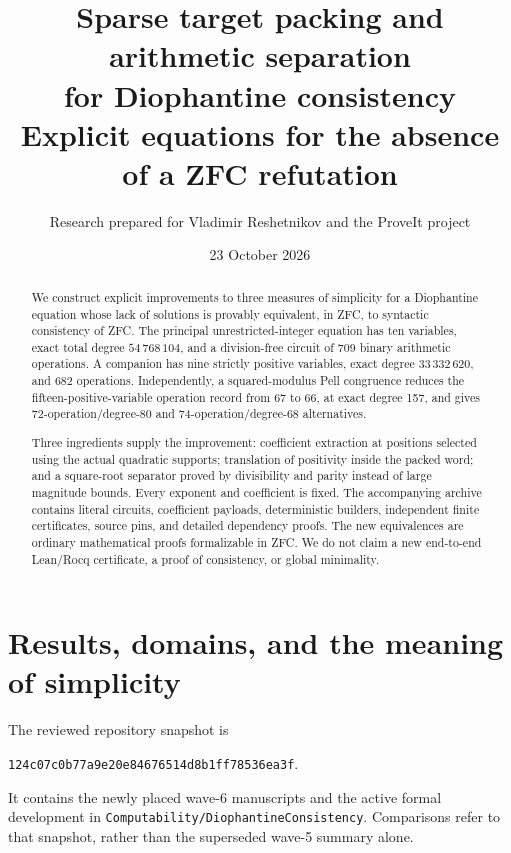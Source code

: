 \documentclass[11pt,letterpaper]{article}
\title{\vspace{-1em}\textbf{Sparse target packing and arithmetic separation\\for Diophantine consistency}\\\large Explicit equations for the absence of a ZFC refutation}
\author{Research prepared for Vladimir Reshetnikov and the ProveIt project}
\date{23 October 2026}
\theoremstyle{remark}\newtheorem{remark}[theorem]{Remark}
\newcommand{\file}[1]{\nolinkurl{#1}}
\begin{document}
\maketitle
\begin{abstract}
We construct explicit improvements to three measures of simplicity for a
Diophantine equation whose lack of solutions is provably equivalent, in
ZFC, to syntactic consistency of ZFC. The principal unrestricted-integer
equation has ten variables, exact total degree $54\,768\,104$, and a
division-free circuit of 709 binary arithmetic operations. A companion has
nine strictly positive variables, exact degree $33\,332\,620$, and 682
operations. Independently, a squared-modulus Pell congruence reduces the
fifteen-positive-variable operation record from 67 to 66, at exact degree
157, and gives 72-operation/degree-80 and 74-operation/degree-68 alternatives.

Three ingredients supply the improvement: coefficient extraction at
positions selected using the actual quadratic supports; translation of
positivity inside the packed word; and a square-root separator proved by
divisibility and parity instead of large magnitude bounds. Every exponent
and coefficient is fixed. The accompanying archive contains literal
circuits, coefficient payloads, deterministic builders, independent finite
certificates, source pins, and detailed dependency proofs. The new
equivalences are ordinary mathematical proofs formalizable in ZFC. We do
not claim a new end-to-end Lean/Rocq certificate, a proof of consistency,
or global minimality.
\end{abstract}
\newpage
\tableofcontents
\newpage

\section{Results, domains, and the meaning of simplicity}
The reviewed repository snapshot is
\begin{center}\small\texttt{124c07c0b77a9e20e84676514d8b1ff78536ea3f}.\end{center}
It contains the newly placed wave-6 manuscripts and the active formal
development in \file{Computability/DiophantineConsistency}. Comparisons
refer to that snapshot, rather than the superseded wave-5 summary alone.
\end{document}
